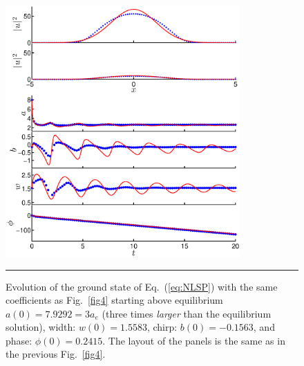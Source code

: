 {\begin{figure}[htbp]
\centering
\centerline{\includegraphics[width=0.8\textwidth]{Figures/Fig3b_P4_decrease_v2N.eps}}
  \rule{35em}{0.5pt}
\caption[Exciton-Polariton Below Equilibrium]{
Evolution of the ground state of Eq.~(\ref{eq:NLSP}) with the same coefficients as Fig.~\ref{fig4} starting above equilibrium
%
$a(0)= 7.9292 = 3 a_e$ (three times {\em larger}  than the equilibrium solution), width:  $w(0)=1.5583$, chirp: $b(0) = -0.1563$, and phase: $\phi(0)=0.2415$.
%
The layout of the panels is the same as in the previous Fig.~\ref{fig4}.
\label{fig5}}
\end{figure}

}
